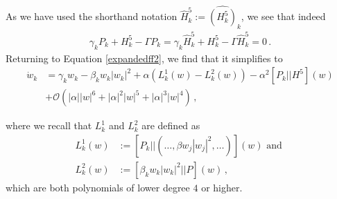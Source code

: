 \documentclass[12pt]{article}
\renewcommand{\mathcal}{\mathscr}
\theoremstyle{plain}
\theoremstyle{definition}
\theoremstyle{remark}
\theoremstyle{remark}
\begin{document}
As we have used the shorthand notation  $\widehat{H}_k^5 := \widehat{({H^5_k})}_k$, we see that indeed
\begin{align}
\gamma_kP_k + {H}^5_k - \Gamma P_k = \gamma_k\widehat{H}_k^5 + {H}^5_k - \Gamma \widehat{H}_k^5 = 0\, .
\end{align}
Returning to Equation \eqref{expandedff2}, we find that it simplifies to 
\begin{align}\label{expandedff3}
\dot{w}_k &=  \gamma_kw_k - \beta_k w_k|w_k|^2 + \alpha(L^1_k(w) - L^2_k(w))  - \alpha^2[P_k|| {H}^5](w)  \\ \nonumber
&+ \mathcal{O}(|\alpha||w|^6 + |\alpha|^2|w|^5 + |\alpha|^3|w|^4)\, , 
\end{align}

\noindent where we recall that $L^1_k$ and $L^2_k$ are defined as
\begin{align}
L^1_k(w) &:=  [P_k|| (\dots, \beta w_j|w_j|^2, \dots)](w) \text{ and }\\ \nonumber
L^2_k(w) &:=  [\beta_k w_k |w_k|^2|| P](w)\, ,
\end{align}
which are both polynomials of lower degree $4$ or higher. 
\end{document}

